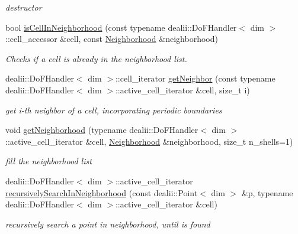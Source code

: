 \begin{DoxyCompactItemize}
\begin{DoxyCompactList}\small\item\em destructor \item\end{DoxyCompactList}\item 
bool \hyperlink{classnatrium_1_1SemiLagrangian_a1e41b66518f92c75135b2873a39160ff}{isCellInNeighborhood} (const typename dealii::DoFHandler$<$ dim $>$::cell\_\-accessor \&cell, const \hyperlink{classnatrium_1_1SemiLagrangian_a8a801296be3b37837a347342f32b2d57}{Neighborhood} \&neighborhood)
\begin{DoxyCompactList}\small\item\em Checks if a cell is already in the neighborhood list. \item\end{DoxyCompactList}\item 
dealii::DoFHandler$<$ dim $>$::cell\_\-iterator \hyperlink{classnatrium_1_1SemiLagrangian_aac0394a8292810788e983909b2de4355}{getNeighbor} (const typename dealii::DoFHandler$<$ dim $>$::active\_\-cell\_\-iterator \&cell, size\_\-t i)
\begin{DoxyCompactList}\small\item\em get i-\/th neighbor of a cell, incorporating periodic boundaries \item\end{DoxyCompactList}\item 
void \hyperlink{classnatrium_1_1SemiLagrangian_ab6d5f8d666330d8f229ee727985592b8}{getNeighborhood} (typename dealii::DoFHandler$<$ dim $>$::active\_\-cell\_\-iterator \&cell, \hyperlink{classnatrium_1_1SemiLagrangian_a8a801296be3b37837a347342f32b2d57}{Neighborhood} \&neighborhood, size\_\-t n\_\-shells=1)
\begin{DoxyCompactList}\small\item\em fill the neighborhood list \item\end{DoxyCompactList}\item 
dealii::DoFHandler$<$ dim $>$::active\_\-cell\_\-iterator \hyperlink{classnatrium_1_1SemiLagrangian_a9db13229770025b4c0461d8e4ff4ee50}{recursivelySearchInNeighborhood} (const dealii::Point$<$ dim $>$ \&p, typename dealii::DoFHandler$<$ dim $>$::active\_\-cell\_\-iterator \&cell)
\begin{DoxyCompactList}\small\item\em recursively search a point in neighborhood, until is found \item\end{DoxyCompactList}\item 

\end{DoxyCompactItemize}
